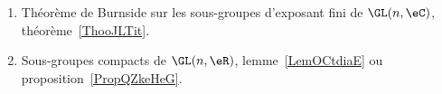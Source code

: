 
	\label{THEMEooSousGroupes}
\begin{enumerate}
	\item
	      Théorème de Burnside sur les sous-groupes d'exposant fini de \( \GL(n,\eC)\), théorème~\ref{ThooJLTit}.
	\item
	      Sous-groupes compacts de \( \GL(n,\eR)\), lemme~\ref{LemOCtdiaE} ou proposition~\ref{PropQZkeHeG}.
\end{enumerate}

